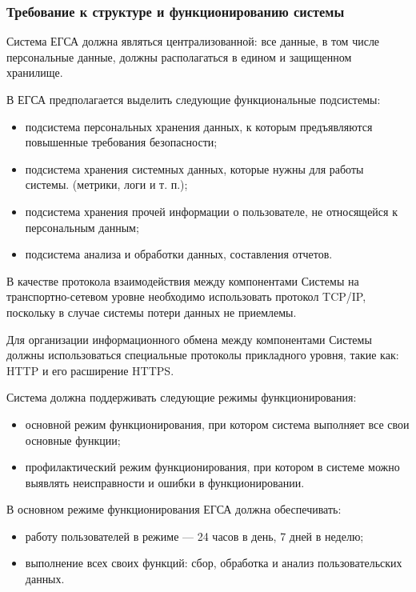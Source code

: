 \documentclass[a4paper, 14pt]{extarticle}
\begin{document}
\subsubsection{Требование к структуре и функционированию системы}

Система ЕГСА должна являться централизованной: все данные, в том числе
персональные данные, должны располагаться в едином и защищенном хранилище.

В ЕГСА предполагается выделить следующие функциональные подсистемы:
\begin{itemize}
  \item подсистема персональных хранения данных, к которым предъявляются
  повышенные требования безопасности;
  \item подсистема хранения системных данных, которые нужны для работы системы.
  (метрики, логи и т. п.);
  \item подсистема хранения прочей информации о пользователе, не относящейся к
  персональным данным;
  \item подсистема анализа и обработки данных, составления отчетов.
\end{itemize}

В качестве протокола взаимодействия между компонентами Системы на
транспортно-сетевом уровне необходимо использовать протокол TCP/IP, поскольку в
случае системы потери данных не приемлемы.

Для организации информационного обмена между компонентами Системы должны
использоваться специальные протоколы прикладного уровня, такие как: HTTP и его
расширение HTTPS.

Система должна поддерживать следующие режимы функционирования:
\begin{itemize}
  \item основной режим функционирования, при котором система выполняет все свои
  основные функции;
  \item профилактический режим функционирования, при котором в системе можно
  выявлять неисправности и ошибки в функционировании.
\end{itemize}

В основном режиме функционирования ЕГСА должна обеспечивать:
\begin{itemize}
  \item работу пользователей в режиме --- 24 часов в день, 7 дней в неделю;
  \item выполнение всех своих функций: сбор, обработка и анализ пользовательских
  данных.
\end{itemize}
\end{document}
